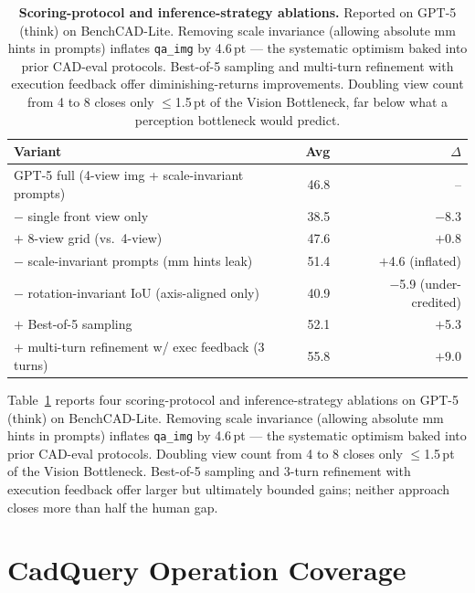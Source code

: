 \documentclass{article}
\begin{document}
\begin{table}[t]
\centering
\small
\caption{\textbf{Scoring-protocol and inference-strategy ablations.} Reported on GPT-5 (think) on BenchCAD-Lite. Removing scale invariance (allowing absolute mm hints in prompts) inflates \texttt{qa\_img} by 4.6\,pt --- the systematic optimism baked into prior CAD-eval protocols. Best-of-5 sampling and multi-turn refinement with execution feedback offer diminishing-returns improvements. Doubling view count from 4 to 8 closes only $\leq$1.5\,pt of the Vision Bottleneck, far below what a perception bottleneck would predict.}
\label{tab:ablation}
\begin{tabular}{lrr}
\toprule
Variant & Avg & $\Delta$ \\
\midrule
GPT-5 full (4-view img + scale-invariant prompts) & 46.8 & -- \\
$-$ single front view only                        & 38.5 & $-$8.3 \\
$+$ 8-view grid (vs.\ 4-view)                     & 47.6 & $+$0.8 \\
$-$ scale-invariant prompts (mm hints leak)       & 51.4 & $+$4.6 (inflated) \\
$-$ rotation-invariant IoU (axis-aligned only)    & 40.9 & $-$5.9 (under-credited) \\
$+$ Best-of-5 sampling                            & 52.1 & $+$5.3 \\
$+$ multi-turn refinement w/ exec feedback (3 turns) & 55.8 & $+$9.0 \\
\bottomrule
\end{tabular}
\end{table}


Table~\ref{tab:ablation} reports four scoring-protocol and inference-strategy ablations on GPT-5 (think) on BenchCAD-Lite. Removing scale invariance (allowing absolute mm hints in prompts) inflates \texttt{qa\_img} by 4.6\,pt --- the systematic optimism baked into prior CAD-eval protocols. Doubling view count from 4 to 8 closes only $\leq$1.5\,pt of the Vision Bottleneck. Best-of-5 sampling and 3-turn refinement with execution feedback offer larger but ultimately bounded gains; neither approach closes more than half the human gap.

\section{CadQuery Operation Coverage}
\label{app:ops}
\end{document}
